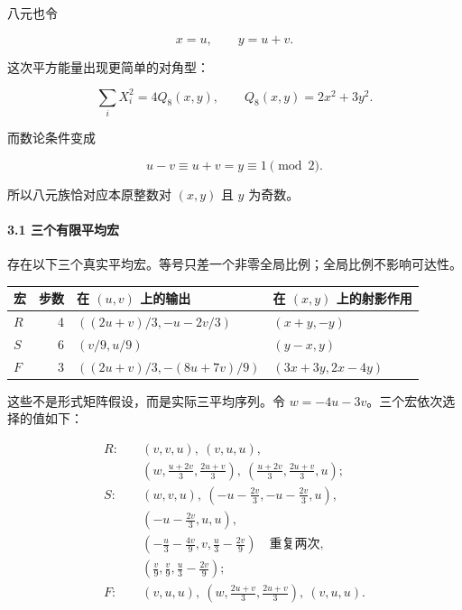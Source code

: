 {八元也令}

\[
x=u,\qquad y=u+v.
\]

{这次平方能量出现更简单的对角型：}

\[
\sum_iX_i^2=4Q_8(x,y),\qquad
Q_8(x,y)=2x^2+3y^2.
\]

{而数论条件变成}

\[
u-v\equiv u+v=y\equiv1\pmod2.
\]

{所以八元族恰对应本原整数对} \((x,y)\) {且} \(y\) {为奇数。}

\paragraph*{\texorpdfstring{{3.1} {三个有限平均宏}}{3.1 三个有限平均宏}}\label{C34-h227}

{存在以下三个真实平均宏。等号只差一个非零全局比例；全局比例不影响可达性。}

{ %
\begin{longtable}[]{@{}lrll@{}}
\toprule\noalign{}
{宏} & {步数} & {在} \((u,v)\) {上的输出} & {在} \((x,y)\) {上的射影作用} \\
\midrule\noalign{}
\endhead
\bottomrule\noalign{}
\endlastfoot
\(R\) & {4} & \(((2u+v)/3,-u-2v/3)\) & \((x+y,-y)\) \\
\(S\) & {6} & \((v/9,u/9)\) & \((y-x,y)\) \\
\(F\) & {3} & \(((2u+v)/3,-(8u+7v)/9)\) & \((3x+3y,2x-4y)\) \\
\end{longtable}
}

{这些不是形式矩阵假设，而是实际三平均序列。令} \(w=-4u-3v\){。三个宏依次选择的值如下：}

\[
\begin{aligned}
R:\quad &(v,v,u),\ (v,u,u),\\
&\left(w,\frac{u+2v}{3},\frac{2u+v}{3}\right),\
\left(\frac{u+2v}{3},\frac{2u+v}{3},u\right);\\[3pt]
S:\quad &(w,v,u),\ \left(-u-\frac{2v}{3},-u-\frac{2v}{3},u\right),\\
&\left(-u-\frac{2v}{3},u,u\right),\\
&\left(-\frac u3-\frac{4v}{9},v,\frac u3-\frac{2v}{9}\right)
\quad\text{重复两次},\\
&\left(\frac v9,\frac v9,\frac u3-\frac{2v}{9}\right);\\[3pt]
F:\quad &(v,u,u),\
\left(w,\frac{2u+v}{3},\frac{2u+v}{3}\right),\
(v,u,u).
\end{aligned}
\]

